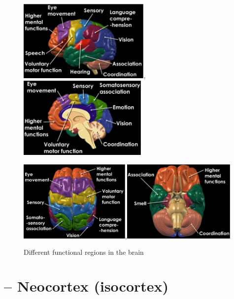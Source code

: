 \begin{figure}[hbt]
  \centerline{\includegraphics[height=4cm,
    angle=0]{./images/brain_06.eps},\includegraphics[height=4cm,
    angle=0]{./images/brain_07.eps}}
  \centerline{\includegraphics[height=4cm,
    angle=0]{./images/brain_08.eps},\includegraphics[height=4cm,
    angle=0]{./images/brain_09.eps}}
 \caption{Different functional regions in the brain}
\label{fig:functional_region}
\end{figure}



\section{-- Neocortex (isocortex)}
\label{sec:neocortex-details}

